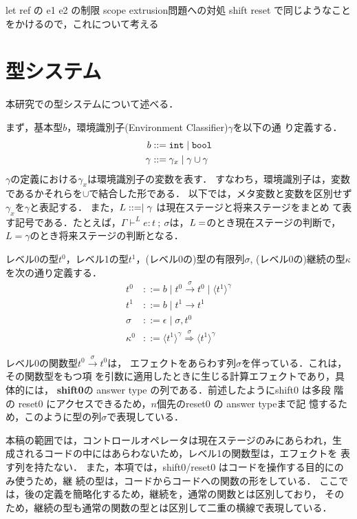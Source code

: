 \documentclass[T]{compsoft}
\newcommand\Shiftz{\textbf{shift0}}
\newcommand\intT{\mbox{\texttt{int}}}
\newcommand\boolT{\mbox{\texttt{bool}}}
\newcommand\codeT[2]{\langle{#1}\rangle^{#2}}
\newcommand\funT[3]{{#1} \stackrel{#3}{\rightarrow} {#2}}
\newcommand\contT[3]{{#1} \stackrel{#3}{\Rightarrow} {#2}}
\theoremstyle{break}
\begin{document}
let ref の e1 e2 の制限 scope extrusion問題への対処
shift reset で同じようなことをかけるので，これについて考える


\section{型システム}

本研究での型システムについて述べる．

まず，基本型$b$，環境識別子(Environment Classifier)$\gamma$を以下の通
り定義する．
\begin{align*}
  b & ::= \intT \mid \boolT \\
  \gamma & ::= \gamma_x \mid \gamma \cup \gamma
\end{align*}
$\gamma$の定義における$\gamma_x$は環境識別子の変数を表す．
すなわち，環境識別子は，変数であるかそれらを$\cup$で結合した形である．
以下では，メタ変数と変数を区別せず$\gamma_x$を$\gamma$と表記する．
また，$L ::= \empty \mid \gamma$ は現在ステージと将来ステージをまとめ
て表す記号である．たとえば，$\Gamma \vdash^L
e:t~;~\sigma$は，$L=\empty$のとき現在ステージの判断で，
$L=\gamma$のとき将来ステージの判断となる．

レベル0の型$t^0$，レベル1の型$t^1$，(レベル0の)型の有限列$\sigma$,
(レベル0の)継続の型$\kappa$を次の通り定義する．
\begin{align*}
  t^0 & ::= b \mid \funT{t^0}{t^0}{\sigma} \mid \codeT{t^1}{\gamma} \\
  t^1 & ::= b \mid t^1 \to t^1 \\
  \sigma & ::= \epsilon \mid \sigma,t^0 \\
  \kappa^0 & ::= \contT{\codeT{t^1}{\gamma}}{\codeT{t^1}{\gamma}}{\sigma}
\end{align*}

レベル0の関数型$\funT{t^0}{t^0}{\sigma}$は，
エフェクトをあらわす列$\sigma$を伴っている．これは，その関数型をもつ項
を引数に適用したときに生じる計算エフェクトであり，具体的には，
\Shiftz の answer type の列である．前述したようにshift0 は多段
階の reset0 にアクセスできるため，$n$個先のreset0 の answer typeまで記
憶するため，このように型の列$\sigma$で表現している．

本稿の範囲では，コントロールオペレータは現在ステージのみにあらわれ，生
成されるコードの中にはあらわないため，レベル1の関数型は，エフェクトを
表す列を持たない．
また，本項では，shift0/reset0 はコードを操作する目的にのみ使うため，継
続の型は，コードからコードへの関数の形をしている．
ここでは，後の定義を簡略化するため，継続を，通常の関数とは区別しており，
そのため，継続の型も通常の関数の型とは区別して二重の横線で表現している．
\end{document}
